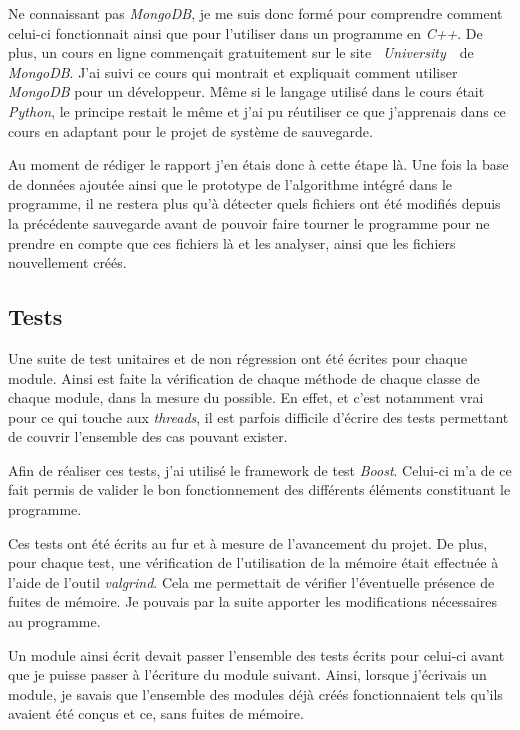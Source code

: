 \documentclass[a4paper,10pt, twoside]{report}
\begin{document}
\begin{spacing}{1.2}
Ne connaissant pas \textit{MongoDB}, je me suis donc formé pour comprendre
comment celui-ci fonctionnait ainsi que pour l'utiliser dans un programme en
\textit{C++}. De plus, un cours en ligne commençait gratuitement sur le site
\flqq~\textit{University}~\frqq~de \textit{MongoDB}\cite{refMongoDBUniversity}.
J'ai suivi ce cours qui montrait et expliquait comment utiliser \textit{MongoDB}
pour un développeur. Même si le langage utilisé dans le cours était
\textit{Python}, le principe restait le même et j'ai pu réutiliser ce que
j'apprenais dans ce cours en adaptant pour le projet de système de sauvegarde.

Au moment de rédiger le rapport j'en étais donc à cette étape là. Une fois la
base de données ajoutée ainsi que le prototype de l'algorithme intégré dans le
programme, il ne restera plus qu'à détecter quels fichiers ont été modifiés
depuis la précédente sauvegarde avant de pouvoir faire tourner le programme
pour ne prendre en compte que ces fichiers là et les analyser, ainsi que les
fichiers nouvellement créés.

\subsection{Tests}

Une suite de test unitaires et de non régression ont été écrites pour chaque
module. Ainsi est faite la vérification de chaque méthode de chaque classe de
chaque module, dans la mesure du possible. En effet, et c'est notamment vrai
pour ce qui touche aux \textit{threads}, il est parfois difficile d'écrire des
tests permettant de couvrir l'ensemble des cas pouvant exister.

Afin de réaliser ces tests, j'ai utilisé le framework de test \textit{Boost}.
Celui-ci m'a de ce fait permis de valider le bon fonctionnement des différents
éléments constituant le programme.

Ces tests ont été écrits au fur et à mesure de l'avancement du projet. De plus,
pour chaque test, une vérification de l'utilisation de la mémoire était
effectuée à l'aide de l'outil \textit{valgrind}. Cela me permettait de vérifier
l'éventuelle présence de fuites de mémoire. Je pouvais par la suite apporter les
modifications nécessaires au programme.

Un module ainsi écrit devait passer l'ensemble des tests écrits pour celui-ci
avant que je puisse passer à l'écriture du module suivant. Ainsi, lorsque
j'écrivais un module, je savais que l'ensemble des modules déjà créés
fonctionnaient tels qu'ils avaient été conçus et ce, sans fuites de mémoire.


\end{spacing}
\end{document}
